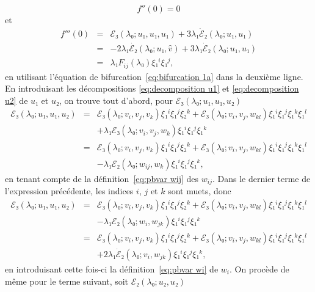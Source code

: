 \documentclass[12pt, final]{amsart}
\theoremstyle{definition}
\begin{document}
\begin{equation}
  \label{eq:DL energie derivee 2nde} f''(0) = 0
\end{equation}
et
\begin{eqnarray}
  f'''(0) & = & ℰ₃(λ₀ ; u₁, u₁, u₁) + 3 λ₁
  \dot{ℰ}₂(λ₀ ; u₁, u₁) \nonumber\\
  & = & - 2 λ₁  \dot{ℰ₂}(λ₀ ; u₁, \hat{v}) + 3
  λ₁  \dot{ℰ}₂(λ₀ ; u₁, u₁) \nonumber\\
  & = & λ₁ F_{i  j}(λ₀) ξ₁^i ξ₁^j,  \label{eq:DL
  energie derivee 3ieme}
\end{eqnarray}
en utilisant l'équation de bifurcation~\eqref{eq:bifurcation 1a} dans la deuxième ligne. En introduisant les décompositions \eqref{eq:decomposition u1} et \eqref{eq:decomposition u2} de \(u₁\) et \(u₂\), on trouve tout d'abord, pour \(ℰ₃(λ₀ ; u₁, u₁, u₂)\)
\begin{eqnarray*}
  ℰ₃(λ₀ ; u₁, u₁, u₂) & = & ℰ₃(λ₀ ;
  v_i, v_j, v_k) ξ₁^i ξ₁^j ξ₂^k +ℰ₃(λ₀ ; v_i, v_j,
  w_{k  l}) ξ₁^i ξ₁^j ξ₁^k ξ₁^l\\
  &  &  + λ₁ ℰ₃(λ₀ ; v_i, v_j, w_k)
  ξ₁^i ξ₁^j ξ₁^k\\
  & = & ℰ₃(λ₀ ; v_i, v_j, v_k) ξ₁^i ξ₁^j ξ₂^k
  +ℰ₃(λ₀ ; v_i, v_j, w_{k  l}) ξ₁^i ξ₁^j
  ξ₁^k ξ₁^l\\
  &  &  - λ₁ ℰ₂(λ₀ ; w_{i  j},
  w_k) ξ₁^i ξ₁^j ξ₁^k,
\end{eqnarray*}
en tenant compte de la définition~\eqref{eq:pbvar wij} des \(w_{i j}\). Dans le dernier terme de l'expression précédente, les indices \(i\), \(j\) et \(k\) sont muets, donc
\begin{eqnarray*}
  ℰ₃(λ₀ ; u₁, u₁, u₂) & = & ℰ₃(λ₀ ;
  v_i, v_j, v_k) ξ₁^i ξ₁^j ξ₂^k +ℰ₃(λ₀ ; v_i, v_j,
  w_{k  l}) ξ₁^i ξ₁^j ξ₁^k ξ₁^l\\
  &  &  - λ₁ ℰ₂(λ₀ ; w_{i }, w_{j
   k}) ξ₁^i ξ₁^j ξ₁^k\\
  & = & ℰ₃(λ₀ ; v_i, v_j, v_k) ξ₁^i ξ₁^j ξ₂^k
  +ℰ₃(λ₀ ; v_i, v_j, w_{k  l}) ξ₁^i ξ₁^j
  ξ₁^k ξ₁^l\\
  &  &  + 2 λ₁  \dot{ℰ}₂(λ₀ ; v_{i
  }, w_{j  k}) ξ₁^i ξ₁^j ξ₁^k,
\end{eqnarray*}
en introduisant cette fois-ci la définition~\eqref{eq:pbvar wi} de \(w_i .\) On procède de même pour le terme suivant, soit \(ℰ₂(λ₀ ; u₂, u₂)\)
\end{document}
